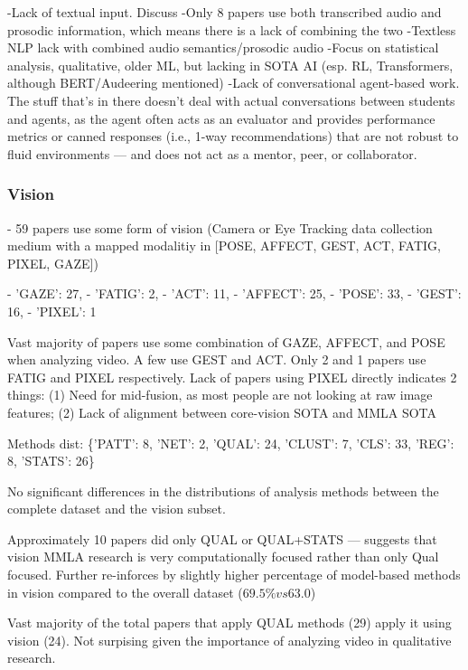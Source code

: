 \documentclass[manuscript,screen,review]{acmart}
\begin{document}
-Lack of textual input. Discuss
-Only 8 papers use both transcribed audio and prosodic information, which means there is a lack of combining the two
    -Textless NLP lack with combined audio semantics/prosodic audio
-Focus on statistical analysis, qualitative, older ML, but lacking in SOTA AI (esp. RL, Transformers, although BERT/Audeering mentioned)
-Lack of conversational agent-based work. The stuff that's in there doesn't deal with actual conversations between students and agents, as the agent often acts as an evaluator and provides performance metrics or canned responses (i.e., 1-way recommendations) that are not robust to fluid environments  --- and does not act as a mentor, peer, or collaborator.

\subsubsection{Vision}
- 59 papers use some form of vision (Camera or Eye Tracking data collection medium with a mapped modalitiy in [POSE, AFFECT, GEST, ACT, FATIG, PIXEL, GAZE])

- 'GAZE': 27,
- 'FATIG': 2,
- 'ACT': 11,
- 'AFFECT': 25,
- 'POSE': 33,
- 'GEST': 16,
- 'PIXEL': 1

Vast majority of papers use some combination of GAZE, AFFECT, and POSE when analyzing video. A few use GEST and ACT. Only 2 and 1 papers use FATIG and PIXEL respectively. Lack of papers using PIXEL directly indicates 2 things: (1) Need for mid-fusion, as most people are not looking at raw image features; (2) Lack of alignment between core-vision SOTA and MMLA SOTA

Methods dist: \{'PATT': 8, 'NET': 2, 'QUAL': 24, 'CLUST': 7, 'CLS': 33, 'REG': 8, 'STATS': 26\}

No significant differences in the distributions of analysis methods between the complete dataset and the vision subset.

Approximately 10 papers did only QUAL or QUAL+STATS --- suggests that vision MMLA research is very computationally focused rather than only Qual focused. Further re-inforces by slightly higher percentage of model-based methods in vision compared to the overall dataset ($69.5\% vs 63.0$)

Vast majority of the total papers that apply QUAL methods (29) apply it using vision (24). Not surpising given the importance of analyzing video in qualitative research.
\end{document}
